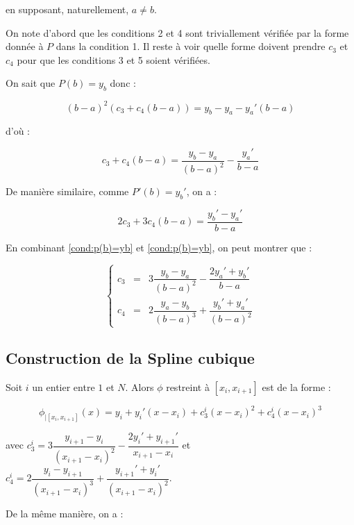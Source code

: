 en supposant, naturellement, $a \neq b$.

On note d'abord que les conditions 2 et 4 sont triviallement vérifiée par la forme donnée à $P$ dans la condition 1.
Il reste à voir quelle forme doivent prendre $c_3$ et $c_4$ pour que les conditions 3 et 5 soient vérifiées.

On sait que $P(b) = y_b$ donc :

$$(b-a)^2 (c_3 + c_4 (b-a)) = y_b - y_a - y_a' (b-a)$$

d'où :

\begin{equation}
c_ 3 + c_4 (b-a) = \dfrac{y_b - y_a}{(b-a)^2} - \dfrac{y_a'}{b-a}
\label{cond:p(b)=yb}
\end{equation}

De manière similaire, comme $P'(b) = y_b'$, on a :

\begin{equation}
2 c_3 + 3 c_4 (b-a) = \dfrac{y_b' - y_a'}{b-a}
\label{cond:p'(b)=yb'}
\end{equation}

En combinant \eqref{cond:p(b)=yb} et \eqref{cond:p(b)=yb}, on peut montrer que :

\begin{equation}
\left\lbrace
\begin{array}{rcl}
c_3 & = & 3 \dfrac{y_b - y_a}{(b-a)^2} - \dfrac{2 y_a' + y_b'}{b-a} \\
c_ 4 & = & 2 \dfrac{y_a - y_b}{(b-a)^3} + \dfrac{y_b' + y_a'}{(b-a)^2}
\end{array}
\right.
\label{cond:c3 and c4}
\end{equation}

\subsection{Construction de la Spline cubique}

Soit $i$ un entier entre $1$ et $N$.
Alors $\phi$ restreint à $[x_i, x_{i+1}]$ est de la forme :

\begin{equation}
\phi_{|[x_i, x_{i+1}]} (x) = y_i + y_i' (x-x_i) + c_3^i (x-x_i)^2 + c_4^i (x-x_i)^3
\end{equation}

avec $c_3^i = 3 \dfrac{y_{i+1} - y_i}{(x_{i+1}-x_i)^2} - \dfrac{2 y_i' + y_{i+1}'}{x_{i+1}-x_i}$ et 
$c_4^i = 2 \dfrac{y_i - y_{i+1}}{(x_{i+1}-x_i)^3} + \dfrac{y_{i+1}' + y_i'}{(x_{i+1}-x_i)^2}$.

De la même manière, on a :

